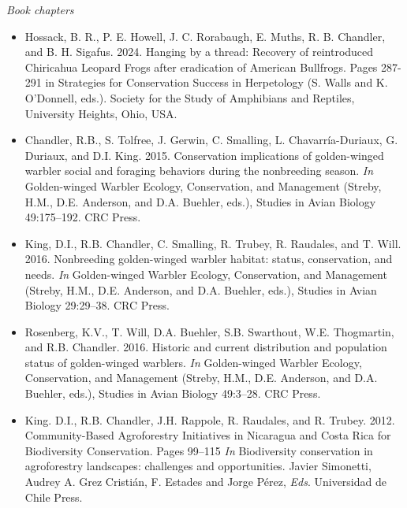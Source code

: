 \documentclass[12pt]{article}
\begin{document}
\emph{Book chapters}
\begin{itemize}

  \item Hossack, B. R., P. E. Howell, J. C. Rorabaugh, E. Muths,
    R. B. Chandler, and B. H. Sigafus. 2024. Hanging by a thread:
    Recovery of reintroduced Chiricahua Leopard Frogs after
    eradication of American Bullfrogs. Pages 287-291 in Strategies for
    Conservation Success in Herpetology (S. Walls and K. O’Donnell,
    eds.). Society for the Study of Amphibians and Reptiles,
    University Heights, Ohio, USA.  


  \item Chandler, R.B., S. Tolfree, J. Gerwin, C. Smalling,
    L. Chavarr\'ia-Duriaux, G. Duriaux, and
    D.I. King. 2015. Conservation implications of golden-winged 
    warbler social and  
    foraging behaviors during the nonbreeding season. {{\it In}
      Golden-winged Warbler Ecology, Conservation, and Management}
    (Streby, H.M., D.E. Anderson, and D.A. Buehler, eds.), Studies in
    Avian Biology 49:175--192. CRC Press. 

  \item King, D.I., R.B. Chandler, C. Smalling, R. Trubey,
    R. Raudales, and T. Will. 2016. Nonbreeding golden-winged
    warbler habitat: status, conservation, and needs. {{\it In} Golden-winged
    Warbler Ecology, Conservation, and Management} (Streby, H.M.,
    D.E. Anderson, and D.A. Buehler, eds.), Studies in Avian Biology
    29:29--38. CRC Press. 

  \item Rosenberg, K.V., T. Will, D.A. Buehler, S.B. Swarthout,
    W.E. Thogmartin, and R.B. Chandler. 2016. Historic and current
    distribution and population status of golden-winged warblers. {\it
      In} Golden-winged Warbler Ecology, Conservation, and Management
    (Streby, H.M., D.E. Anderson, and D.A. Buehler, eds.), Studies in
    Avian Biology 49:3--28. CRC Press. 

  \item King. D.I., R.B. Chandler, J.H. Rappole, R. Raudales, and
    R. Trubey. 2012. Community-Based
    Agroforestry Initiatives in Nicaragua and Costa Rica for
    Biodiversity Conservation. Pages 99--115 {\it In} Biodiversity
    conservation in agroforestry landscapes: challenges and
    opportunities. Javier Simonetti, Audrey A. Grez Cristi\'{a}n,
    F. Estades and Jorge P\'{e}rez, \emph{Eds}. Universidad de Chile Press.
\end{itemize}
\end{document}

